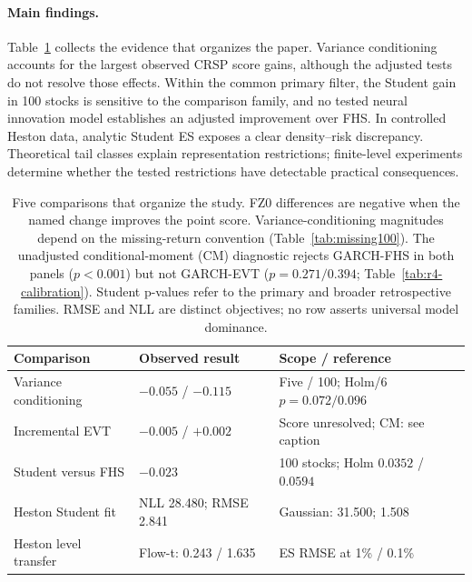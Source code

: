 \documentclass[11pt]{article}
\theoremstyle{definition}\newtheorem{definition}[theorem]{Definition}
\theoremstyle{remark}\newtheorem{remark}[theorem]{Remark}
\begin{document}
\paragraph{Main findings.}
Table~\ref{tab:r5-summary} collects the evidence that organizes the paper. Variance conditioning accounts for the largest observed CRSP score gains, although the adjusted tests do not resolve those effects. Within the common primary filter, the Student gain in 100 stocks is sensitive to the comparison family, and no tested neural innovation model establishes an adjusted improvement over FHS. In controlled Heston data, analytic Student ES exposes a clear density--risk discrepancy. Theoretical tail classes explain representation restrictions; finite-level experiments determine whether the tested restrictions have detectable practical consequences.
\begin{table}[htbp]
\centering\footnotesize
\setlength{\tabcolsep}{4pt}
\begin{tabular}{lll}
\toprule
Comparison & Observed result & Scope / reference \\
\midrule
Variance conditioning & $-0.055$ / $-0.115$ & Five / 100; Holm/6 $p=0.072/0.096$ \\
Incremental EVT & $-0.005$ / $+0.002$ & Score unresolved; CM: see caption \\
Student versus FHS & $-0.023$ & 100 stocks; Holm $0.0352$ / $0.0594$ \\
Heston Student fit & NLL 28.480; RMSE 2.841 & Gaussian: 31.500; 1.508 \\
Heston level transfer & Flow-t: 0.243 / 1.635 & ES RMSE at 1\% / 0.1\% \\
\bottomrule
\end{tabular}
\caption{Five comparisons that organize the study. FZ0 differences are negative when the named change improves the point score. Variance-conditioning magnitudes depend on the missing-return convention (Table~\ref{tab:missing100}). The unadjusted conditional-moment (CM) diagnostic rejects GARCH-FHS in both panels ($p<0.001$) but not GARCH-EVT ($p=0.271/0.394$; Table~\ref{tab:r4-calibration}). Student p-values refer to the primary and broader retrospective families. RMSE and NLL are distinct objectives; no row asserts universal model dominance.}\label{tab:r5-summary}
\end{table}
\end{document}
